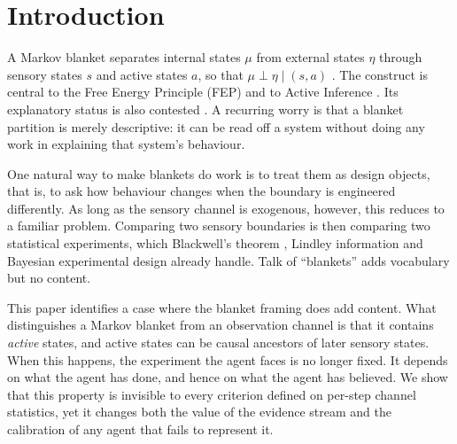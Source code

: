\documentclass[11pt]{article}
\theoremstyle{definition}
\theoremstyle{remark}
\begin{document}
\section{Introduction}

A Markov blanket separates internal states $\mu$ from external states $\eta$
through sensory states $s$ and active states $a$, so that
$\mu\perp\eta\mid(s,a)$
\citep{kirchhoff2018markov,dacosta2021bayesian,friston2023simpler}. The construct
is central to the Free Energy Principle (FEP) and to Active Inference
\citep{parr2022active}. Its explanatory status is also contested
\citep{biehl2021technical,bruineberg2022emperor}. A recurring worry is that a
blanket partition is merely descriptive: it can be read off a system without
doing any work in explaining that system's behaviour.

One natural way to make blankets do work is to treat them as design objects,
that is, to ask how behaviour changes when the boundary is engineered
differently. As long as the sensory channel is exogenous, however, this reduces
to a familiar problem. Comparing two sensory boundaries is then comparing two
statistical experiments, which Blackwell's theorem \citep{blackwell1953}, Lindley
information \citep{lindley1956} and Bayesian experimental design
\citep{chaloner1995} already handle. Talk of ``blankets'' adds vocabulary but no
content.

This paper identifies a case where the blanket framing does add content. What
distinguishes a Markov blanket from an observation channel is that it contains
\emph{active} states, and active states can be causal ancestors of later sensory
states. When this happens, the experiment the agent faces is no longer fixed. It
depends on what the agent has done, and hence on what the agent has believed. We
show that this property is invisible to every criterion defined on per-step
channel statistics, yet it changes both the value of the evidence stream and the
calibration of any agent that fails to represent it.
\end{document}
